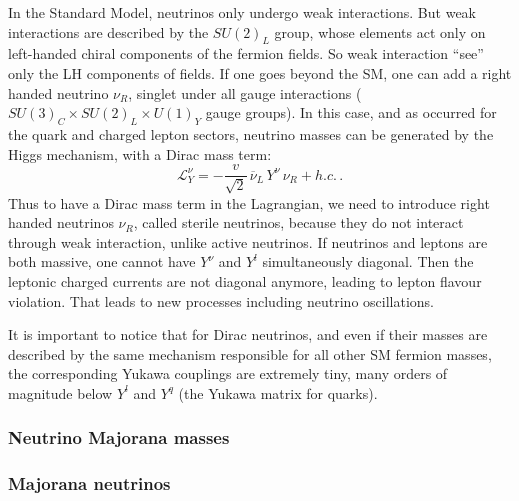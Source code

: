 In the Standard Model, neutrinos only undergo weak interactions.
But weak interactions are described by the $SU(2)_L$ group, whose elements act only on left-handed chiral components of the fermion fields.
So weak interaction ``see'' only the LH components of fields.
If one goes beyond the SM, one can add a right handed neutrino $\nu_R$, singlet under all gauge interactions ($SU(3)_{C}\times SU(2)_{L}\times U(1)_{Y}$ gauge groups).
In this case, and as occurred for the quark and charged lepton sectors, neutrino masses can be generated by the Higgs mechanism, with a Dirac mass term:
\begin{equation}
\mathcal{L}^{\nu}_{Y} = -\frac{v}{\sqrt{2}}\,\overline{\nu}_{L}\,Y^{\nu}\,\nu_{R} + h.c.\,.
\label{eq:dirac_mass_term}
\end{equation}
Thus to have a Dirac mass term in the Lagrangian, we need to introduce right handed neutrinos $\nu_R$, called sterile neutrinos, because they do not interact through weak interaction, unlike active neutrinos.
If neutrinos and leptons are both massive, one cannot have $Y^\nu$ and $Y^l$ simultaneously diagonal.
Then the leptonic charged currents are not diagonal anymore, leading to lepton flavour violation.
That leads to new processes including neutrino oscillations.

It is important to notice that for Dirac neutrinos, and even if their masses are described by the same mechanism responsible for all other SM fermion masses, the corresponding Yukawa couplings are extremely tiny, many orders of magnitude below $Y^l$ and $Y^q$ (the Yukawa matrix for quarks).

\subsubsection{Neutrino Majorana masses}
\label{subsec:maj_mass}

\subsubsection*{Majorana neutrinos}

